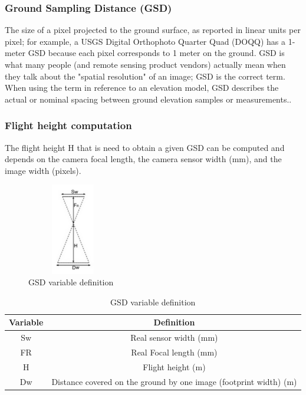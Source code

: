 \subsubsection{Ground Sampling Distance (GSD)}
The size of a pixel projected to the ground surface, as reported in linear units per pixel; for example, a USGS Digital Orthophoto Quarter Quad (DOQQ) has a 1-meter GSD because each pixel corresponds to 1 meter on the ground. GSD is what many people (and remote sensing product vendors) actually mean when they talk about the "spatial resolution" of an image; GSD is the correct term. When using the term in reference to an elevation model, GSD describes the actual or nominal spacing between ground elevation samples or measurements.\cite{Design_plann}.
\subsubsection{Flight height computation}
The flight height H that is need to obtain a given GSD can be computed and depends on the camera focal length, the camera sensor width  (mm), and the image width (pixels).\cite{GSDComputation}
\begin{figure}[H]
\centering
\includegraphics[width=4cm,height=4cm,keepaspectratio]{imagenes/GSD.PNG}
\caption{GSD variable definition}
\label{fig:GSD}
\end{figure}
\begin{table}[H]
\centering
\begin{tabular}{|c|c|}
\hline
\textbf{Variable} & \textbf{Definition}                                                                      \\ \hline
Sw                & Real sensor width (mm)                                                                   \\ \hline
FR                & Real Focal length (mm)                                                                   \\ \hline
H                 & Flight height (m)                                                                        \\ \hline
Dw                & Distance covered on the ground by one image (footprint width) (m) \\ \hline
\end{tabular}
\caption{GSD variable definition}
\end{table}
